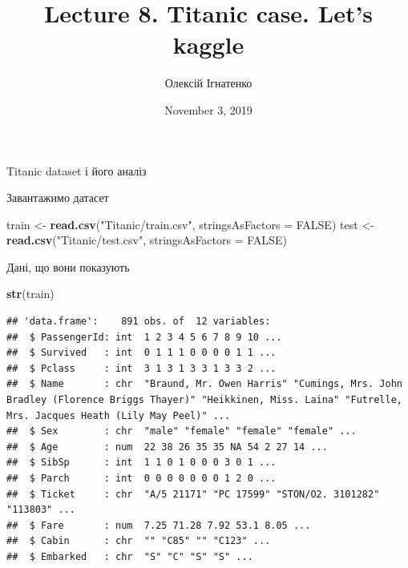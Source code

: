 \documentclass[ignorenonframetext,]{beamer}
\title{Lecture 8. Titanic case. Let's kaggle}
\author{Олексій Ігнатенко}
\date{November 3, 2019}
\newenvironment{Shaded}{\begin{snugshade}}{\end{snugshade}}
\newcommand{\DataTypeTok}[1]{\textcolor[rgb]{0.13,0.29,0.53}{#1}}
\newcommand{\KeywordTok}[1]{\textcolor[rgb]{0.13,0.29,0.53}{\textbf{#1}}}
\newcommand{\NormalTok}[1]{#1}
\newcommand{\OtherTok}[1]{\textcolor[rgb]{0.56,0.35,0.01}{#1}}
\newcommand{\StringTok}[1]{\textcolor[rgb]{0.31,0.60,0.02}{#1}}
\begin{document}
\frame{\titlepage}

\begin{frame}[fragile]{Titanic dataset і його аналіз}
\protect\hypertarget{titanic-dataset-ux456-ux439ux43eux433ux43e-ux430ux43dux430ux43bux456ux437}{}

Завантажимо датасет

\begin{Shaded}
\begin{Highlighting}[]
\NormalTok{train <-}\StringTok{ }\KeywordTok{read.csv}\NormalTok{(}\StringTok{"Titanic/train.csv"}\NormalTok{, }\DataTypeTok{stringsAsFactors =} \OtherTok{FALSE}\NormalTok{)}
\NormalTok{test <-}\StringTok{ }\KeywordTok{read.csv}\NormalTok{(}\StringTok{"Titanic/test.csv"}\NormalTok{, }\DataTypeTok{stringsAsFactors =} \OtherTok{FALSE}\NormalTok{)}
\end{Highlighting}
\end{Shaded}

\end{frame}

\begin{frame}[fragile]{Дані, що вони показують}
\protect\hypertarget{ux434ux430ux43dux456-ux449ux43e-ux432ux43eux43dux438-ux43fux43eux43aux430ux437ux443ux44eux442ux44c}{}

\begin{Shaded}
\begin{Highlighting}[]
\KeywordTok{str}\NormalTok{(train)}
\end{Highlighting}
\end{Shaded}

\begin{verbatim}
## 'data.frame':    891 obs. of  12 variables:
##  $ PassengerId: int  1 2 3 4 5 6 7 8 9 10 ...
##  $ Survived   : int  0 1 1 1 0 0 0 0 1 1 ...
##  $ Pclass     : int  3 1 3 1 3 3 1 3 3 2 ...
##  $ Name       : chr  "Braund, Mr. Owen Harris" "Cumings, Mrs. John Bradley (Florence Briggs Thayer)" "Heikkinen, Miss. Laina" "Futrelle, Mrs. Jacques Heath (Lily May Peel)" ...
##  $ Sex        : chr  "male" "female" "female" "female" ...
##  $ Age        : num  22 38 26 35 35 NA 54 2 27 14 ...
##  $ SibSp      : int  1 1 0 1 0 0 0 3 0 1 ...
##  $ Parch      : int  0 0 0 0 0 0 0 1 2 0 ...
##  $ Ticket     : chr  "A/5 21171" "PC 17599" "STON/O2. 3101282" "113803" ...
##  $ Fare       : num  7.25 71.28 7.92 53.1 8.05 ...
##  $ Cabin      : chr  "" "C85" "" "C123" ...
##  $ Embarked   : chr  "S" "C" "S" "S" ...
\end{verbatim}

\end{frame}
\end{document}
